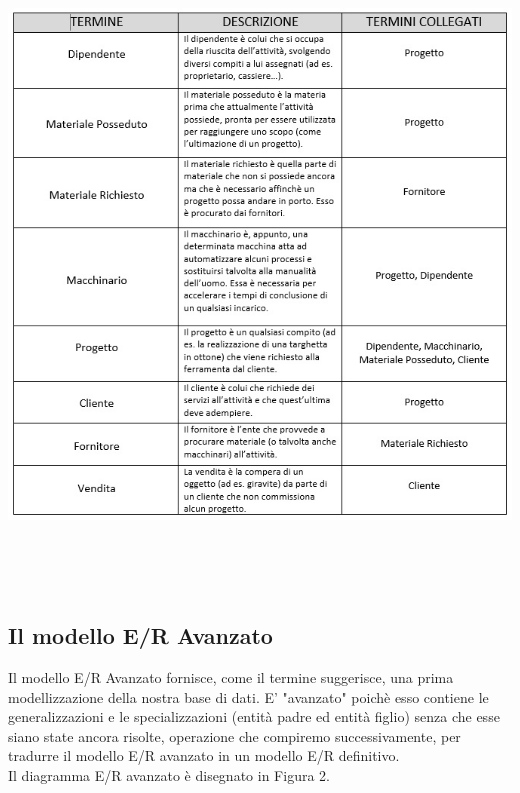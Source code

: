 \documentclass[a4paper,12pt,italian]{article}
\begin{document}
\begin{center}
\includegraphics[width=15cm, height=17.1cm]{tabelladatabase.jpg}
\end{center}
 
\subsection{Il modello E/R Avanzato}
Il modello E/R Avanzato fornisce, come il termine suggerisce, una prima modellizzazione della nostra base di dati. E' "avanzato" poichè esso contiene le generalizzazioni e le specializzazioni (entità padre ed entità figlio) senza che esse siano state ancora risolte, operazione che compiremo successivamente, per tradurre il modello E/R avanzato in un modello E/R definitivo. \\
Il diagramma E/R avanzato è disegnato in Figura 2.
\end{document}
